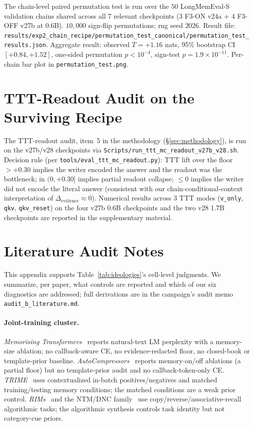 \documentclass{article}
\newcommand{\elift}{\Delta_{\mathrm{evidence}}}
\begin{document}
The chain-level paired permutation test is run over the $50$
LongMemEval-S validation chains shared across all $7$ relevant
checkpoints (3 F3-ON v24a $+$ 4 F3-OFF v27b at 0.6B).
$10{,}000$ sign-flip permutations; rng seed $2026$.  Result file:
\texttt{results/exp2\_chain\_recipe/permutation\_test\_canonical/permutation\_test\_results.json}.
Aggregate result: observed $T = +1.16$ nats, 95\% bootstrap CI
$[+0.84, +1.52]$, one-sided permutation $p < 10^{-4}$, sign-test
$p = 1.9\times 10^{-11}$.  Per-chain bar plot in
\texttt{permutation\_test.png}.

\section{TTT-Readout Audit on the Surviving Recipe}
\label{app:ttt_readout}

The TTT-readout audit, item~5 in the methodology
(\S\ref{sec:methodology}), is run on the v27b/v28 checkpoints via
\texttt{Scripts/run\_ttt\_mc\_readout\_v27b\_v28.sh}.  Decision rule
(per \texttt{tools/eval\_ttt\_mc\_readout.py}): TTT lift over the
floor $>+0.30$ implies the writer encoded the answer and the
readout was the bottleneck; in $(0, +0.30]$ implies partial readout
collapse; $\le 0$ implies the writer did not encode the literal
answer (consistent with our chain-conditional-context interpretation
of $\elift \approx 0$).  Numerical results across $3$ TTT modes
(\texttt{v\_only}, \texttt{qkv}, \texttt{qkv\_reset}) on the four
v27b 0.6B checkpoints and the two v28 1.7B checkpoints are reported
in the supplementary material.

\section{Literature Audit Notes}
\label{app:litaudit}

This appendix supports Table~\ref{tab:ideologies}'s cell-level
judgments.  We summarize, per paper, what controls are reported and
which of our six diagnostics are addressed; full derivations are in
the campaign's audit memo \texttt{audit\_b\_literature.md}.

\paragraph{Joint-training cluster.}
\emph{Memorising Transformers}~\cite{memorizing2022} reports
natural-text LM perplexity with a memory-size ablation; no
callback-aware CE, no evidence-redacted floor, no closed-book or
template-prior baseline.  \emph{AutoCompressors}~\cite{autocompressors2023}
reports memory-on/off ablations (a partial floor) but no template-prior
audit and no callback-token-only CE.  \emph{TRIME}~\cite{trime2022}
uses contextualized in-batch positives/negatives and matched
training/testing memory conditions; the matched conditions are a
weak prior control.  \emph{RIMs}~\cite{rims2021} and the
NTM/DNC family~\cite{ntm2014} use copy/reverse/associative-recall
algorithmic tasks; the algorithmic synthesis controls task identity
but not category-cue priors.
\end{document}
